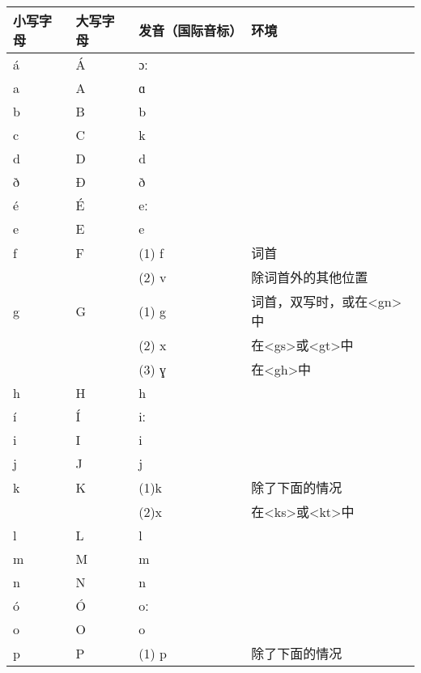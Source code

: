 \begin{table}[H]
  \centering
  \begin{tabular}{@{}llll@{}}
    \toprule
    小写字母 & 大写字母 & 发音（国际音标） & 环境                     \\ \midrule
    á    & Á    & ɔː       &                        \\
    a    & A    & ɑ        &                        \\
    b    & B    & b        &                        \\
    c    & C    & k        &                        \\
    d    & D    & d        &                        \\
    ð    & Ð    & ð        &                        \\
    é    & É    & eː       &                        \\
    e    & E    & e        &                        \\
    f    & F    & (1) f    & 词首                     \\
         &      & (2) v    & 除词首外的其他位置              \\
    g    & G    & (1) g    & 词首，双写时，或在<gn>中         \\
         &      & (2) x    & 在<gs>或<gt>中            \\
         &      & (3) ɣ    & 在<gh>中                 \\
    h    & H    & h        &                        \\
    í    & Í    & iː       &                        \\
    i    & I    & i        &                        \\
    j    & J    & j        &                        \\
    k    & K    & (1)k     & 除了下面的情况                \\
         &      & (2)x     & 在<ks>或<kt>中            \\
    l    & L    & l        &                        \\
    m    & M    & m        &                        \\
    n    & N    & n        &                        \\
    ó    & Ó    & oː       &                        \\
    o    & O    & o        &                        \\
    p    & P    & (1) p    & 除了下面的情况                \\

\end{tabular}
\end{table}
